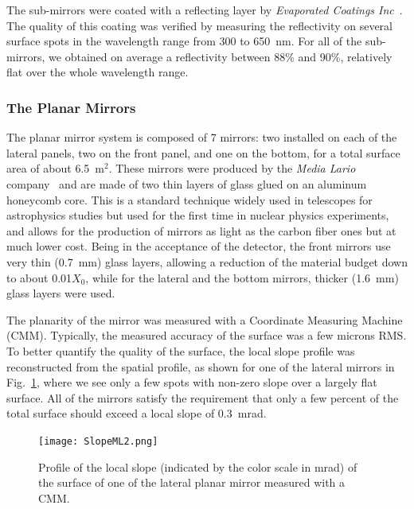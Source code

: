 \documentclass[5p,times,twocolumn]{elsarticle}
\begin{document}
The sub-mirrors were coated with a reflecting layer by {\it Evaporated Coatings Inc}~\cite{REF:ECI}. The quality of
this coating was verified by measuring the reflectivity on several surface spots in the wavelength range from 300 to
650~nm. For all of the sub-mirrors, we obtained on average a reflectivity between 88\% and 90\%, relatively flat over
the whole wavelength range.

\subsubsection{The Planar Mirrors}

The planar mirror system is composed of 7 mirrors: two installed on each of the lateral panels, two on the front panel,
and one on the bottom, for a total surface area of about 6.5~m$^2$. These mirrors were produced by the {\it Media
Lario} company~\cite{REF:MediaLario} and are made of two thin layers of glass glued on an aluminum honeycomb core.
This is a standard technique widely used in telescopes for astrophysics studies but used for the first time in nuclear
physics experiments, and allows for the production of mirrors as light as the carbon fiber ones but at much lower cost.
Being in the acceptance of the detector, the front mirrors use very thin (0.7~mm) glass layers, allowing a reduction of
the material budget down to about 0.01$X_0$, while for the lateral and the bottom mirrors, thicker (1.6~mm) glass
layers were used.

The planarity of the mirror was measured with a Coordinate Measuring Machine (CMM). Typically, the measured
accuracy of the surface was a few microns RMS. To better quantify the quality of the surface, the local slope profile
was reconstructed from the spatial profile, as shown for one of the lateral mirrors in Fig.~\ref{Fig:SlopeML}, where
we see only a few spots with non-zero slope over a largely flat surface. All of the mirrors satisfy the requirement that
only a few percent of the total surface should exceed a local slope of 0.3~mrad.

\begin{figure}
\begin{center}
\texttt{[image: SlopeML2.png]}
\caption{Profile of the local slope (indicated by the color scale in mrad) of the surface of one of the lateral planar
  mirror measured with a CMM.}
\label{Fig:SlopeML}
\end{center}
\end{figure}
\end{document}
